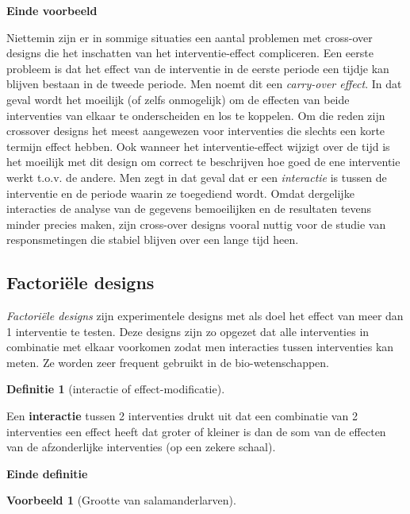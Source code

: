 \documentclass[
  12pt,dutch,coursenotes]{book}
\theoremstyle{definition}
\newtheorem{definition}{Definitie}[chapter]
\theoremstyle{definition}
\newtheorem{example}{Voorbeeld}[chapter]
\theoremstyle{definition}
\theoremstyle{definition}
\theoremstyle{remark}
\begin{document}
\textbf{Einde voorbeeld}

Niettemin zijn er in sommige situaties een aantal problemen met cross-over
designs die het inschatten van het interventie-effect compliceren. Een
eerste probleem is dat het effect van de interventie in de eerste periode
een tijdje kan blijven bestaan in de tweede periode. Men noemt dit een
\emph{carry-over effect}. In dat geval wordt het moeilijk (of zelfs
onmogelijk) om de effecten van beide interventies van elkaar te
onderscheiden en los te koppelen. Om die reden zijn crossover designs het meest aangewezen voor interventies die slechts een korte termijn effect hebben. Ook wanneer het interventie-effect wijzigt over de tijd
is het moeilijk met dit design om correct te beschrijven hoe goed
de ene interventie werkt t.o.v. de andere. Men zegt in dat geval dat er een
\emph{interactie} is tussen de interventie en de periode waarin ze
toegediend wordt. Omdat dergelijke interacties de analyse van de gegevens
bemoeilijken en de resultaten tevens minder precies maken, zijn cross-over
designs vooral nuttig voor de studie van responsmetingen die stabiel
blijven over een lange tijd heen.

\hypertarget{factoriuxeble-designs}{%
\subsection{Factoriële designs}\label{factoriuxeble-designs}}

\emph{Factoriële designs} zijn experimentele designs met als doel het effect van
meer dan 1 interventie te testen. Deze designs zijn zo opgezet dat alle interventies in combinatie met elkaar voorkomen zodat men interacties
tussen interventies kan meten. Ze worden zeer frequent gebruikt in de bio-wetenschappen.

\begin{definition}[interactie of effect-modificatie]
\protect\hypertarget{def:unnamed-chunk-78}{}{\label{def:unnamed-chunk-78} {} }
\end{definition}
Een \textbf{interactie} tussen 2 interventies drukt uit dat een combinatie
van 2 interventies een effect heeft dat groter of kleiner is dan de som van
de effecten van de afzonderlijke interventies (op een zekere schaal).

\textbf{Einde definitie}

\begin{example}[Grootte van salamanderlarven]
\protect\hypertarget{exm:unnamed-chunk-79}{}{\label{exm:unnamed-chunk-79} {} }
\end{example}
\end{document}
